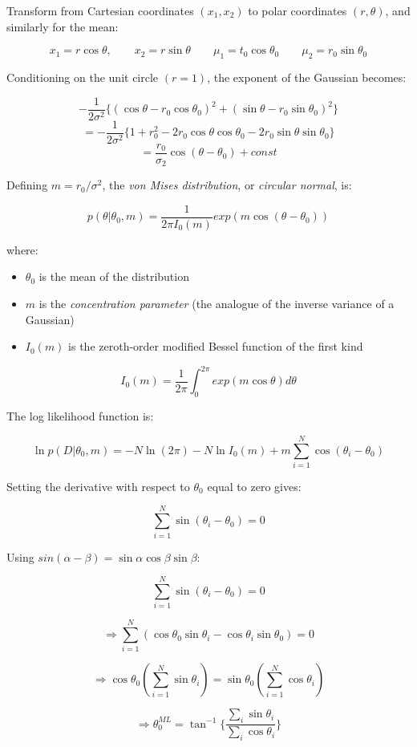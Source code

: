 \documentclass{article}
\begin{document}
Transform from Cartesian coordinates \((x_1, x_2)\) to polar coordinates
\((r,
\theta )\), and similarly for the mean:

\[x_1 = r \cos \theta,\qquad x_2 = r \sin \theta \qquad \mu_1 = t_0 \cos
\theta_0 \qquad \mu_2 = r_0 \sin \theta_0\]

Conditioning on the unit circle \((r=1)\), the exponent of the Gaussian
becomes:

\[-\frac{1}{2\sigma^2} \{ (\cos \theta - r_0 \cos \theta_0)^2 + (\sin \theta -
r_0 \sin \theta_0)^2 \}\]
\[ = -\frac{1}{2\sigma^2} \{1 + r_0^2 - 2r_0 \cos \theta
\cos \theta_0 - 2 r_0 \sin \theta \sin \theta_0\}\]
\[ = \frac{r_0}{\sigma_2} \cos(\theta - \theta_0) + const\]

Defining \(m = r_0 / \sigma^2\), the \emph{von Mises distribution}, or
\emph{circular normal}, is:

\[p(\theta | \theta_0, m) = \frac{1}{2 \pi I_0 (m)} exp(m \cos (\theta -
\theta_0))\]

where:

\begin{itemize}
\item
  \(\theta_0\) is the mean of the distribution
\item
  \(m\) is the \emph{concentration parameter} (the analogue of the
  inverse variance of a Gaussian)
\item
  \(I_0(m)\) is the zeroth-order modified Bessel function of the first
  kind
\end{itemize}

\[I_0(m) = \frac{1}{2\pi} \int_0^{2\pi} exp(m \cos \theta) d\theta\]

The log likelihood function is:

\[\ln p(D | \theta_0, m) = -N \ln (2\pi) - N \ln I_0(m) + m\sum_{i=1}^N \cos
(\theta_i - \theta_0)\]

Setting the derivative with respect to \(\theta_0\) equal to zero gives:

\[\sum_{i=1}^N \sin (\theta_i - \theta_0) = 0\]

Using \(sin(\alpha - \beta) = \sin \alpha \cos \beta \sin \beta\):

\[\sum_{i=1}^N \sin(\theta_i - \theta_0) = 0\]

\[\Rightarrow \sum_{i=1}^N (\cos \theta_0 \sin \theta_i - \cos \theta_i \sin
\theta_0) = 0\]

\[\Rightarrow \cos \theta_0 (\sum_{i=1}^N \sin \theta_i) = \sin \theta_0
(\sum_{i=1}^N \cos \theta_i)\]

\[\Rightarrow \theta_0^{ML} = \tan^{-1} \{ \frac{\sum_i \sin \theta_i}{\sum_i \cos
\theta_i} \}\]
\end{document}
